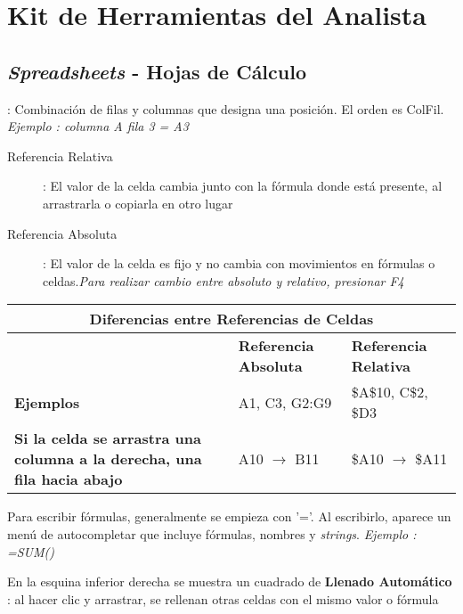 \section {Kit de Herramientas del Analista}

\subsection{\textit{Spreadsheets} - Hojas de Cálculo}
\begin{description}
    \item[Celda]{ : Combinación de filas y columnas que designa una posición. El orden es ColFil. \textit{Ejemplo : columna A fila 3 = A3}
    \begin{description}
        \item[Referencia Relativa]{ : El valor de la celda cambia junto con la fórmula donde está presente, al arrastrarla o copiarla en otro lugar}
        \item[Referencia Absoluta]{ : El valor de la celda es fijo y no cambia con movimientos en fórmulas o celdas.\textit{Para realizar cambio entre absoluto y relativo, presionar F4}}
    \end{description}
    \begin{table}
        \centering
        \begin{tabular}{|p{5cm}|p{4.5cm}|p{4.5cm}|}
            \hline
            \multicolumn{3}{|c|}{Diferencias entre Referencias de Celdas} \\
            \hline
            & \textbf{Referencia Absoluta} & \textbf{Referencia Relativa} \\
            \hline
            \textbf{Ejemplos} & A1, C3, G2:G9 & \$A\$10, C\$2, \$D3 \\
            \hline
            \textbf{Si la celda se arrastra una columna a la derecha, una fila hacia abajo} & A10 $\rightarrow$ B11 & \$A10 $\rightarrow$ \$A11 \\
            \hline
        \end{tabular}
    \end{table}}
    \item{Para escribir fórmulas, generalmente se empieza con '='. Al escribirlo, aparece un menú de autocompletar que incluye fórmulas, nombres y \textit{strings}. \textit{Ejemplo : =SUM()}}
    \item {En la esquina inferior derecha se muestra un cuadrado de \textbf{Llenado Automático} : al hacer clic y arrastrar, se rellenan otras celdas con el mismo valor o fórmula}
\end{description}

